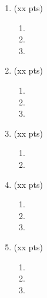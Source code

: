 \documentclass[11pt]{article}   %
\begin{document}
\begin{enumerate}[Q1.]
\item (xx pts)
\begin{enumerate}
\item 
\item 
\item 
\end{enumerate}
	\begin{solution}
	\newpage\phantom{xxx}
	\newpage\phantom{xxx}
	\end{solution}

\item (xx pts)
\begin{enumerate}
\item 
\item 
\item 
\end{enumerate}
	\begin{solution}
	\newpage\phantom{xxx}
	\newpage\phantom{xxx}
	\end{solution}
\item (xx pts)
\begin{enumerate}
\item 
\item 
\end{enumerate}
	\begin{solution}
	\newpage\phantom{xxx}
	\newpage\phantom{xxx}
	\end{solution}
\item (xx pts)
\begin{enumerate}
\item 
\item 
\item 
\end{enumerate}
	\begin{solution}
	\newpage\phantom{xxx}
	\newpage\phantom{xxx}
	\end{solution}
\item (xx pts)
\begin{enumerate}
\item 
\item 
\item 
\end{enumerate}
	\begin{solution}
	\newpage\phantom{xxx}
	\newpage\phantom{xxx}
	\end{solution}


\end{enumerate}
\end{document}
